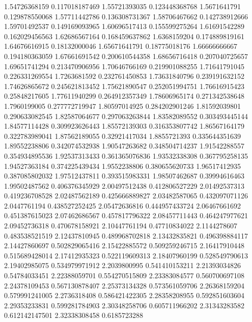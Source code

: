   1.54726368159   0.117018187469
  1.55721393035   0.123448368768
   1.5671641791   0.129878550068
  1.57711442786   0.136308731367
  1.58706467662   0.142738912666
  1.59701492537   0.149169093965
  1.60696517413   0.155599275264
  1.61691542289   0.162029456563
  1.62686567164   0.168459637862
   1.6368159204   0.174889819161
  1.64676616915    0.18132000046
  1.65671641791    0.18775018176
  1.66666666667   0.194180363059
  1.67661691542   0.200610544358
  1.68656716418   0.207040725657
  1.69651741294   0.213470906956
  1.70646766169   0.219901088255
  1.71641791045   0.226331269554
   1.7263681592   0.232761450853
  1.73631840796   0.239191632152
  1.74626865672   0.245621813452
  1.75621890547   0.252051994751
  1.76616915423    0.25848217605
  1.77611940299   0.264912357349
  1.78606965174   0.271342538648
   1.7960199005   0.277772719947
  1.80597014925   0.284202901246
  1.81592039801   0.290633082545
  1.82587064677   0.297063263844
  1.83582089552   0.303493445144
  1.84577114428   0.309923626443
  1.85572139303   0.316353807742
  1.86567164179   0.322783989041
  1.87562189055    0.32921417034
   1.8855721393   0.335644351639
  1.89552238806   0.342074532938
  1.90547263682   0.348504714237
  1.91542288557   0.354934895536
  1.92537313433   0.361365076836
  1.93532338308   0.367795258135
  1.94527363184   0.374225439434
   1.9552238806   0.380655620733
  1.96517412935   0.387085802032
  1.97512437811   0.393515983331
  1.98507462687    0.39994616463
  1.99502487562   0.406376345929
  2.00497512438   0.412806527229
  2.01492537313   0.419236708528
  2.02487562189   0.425666889827
  2.03482587065   0.432097071126
   2.0447761194   0.438527252425
  2.05472636816   0.444957433724
  2.06467661692   0.451387615023
  2.07462686567   0.457817796322
  2.08457711443   0.464247977621
  2.09452736318   0.470678158921
  2.10447761194    0.47710834022
   2.1144278607   0.483538521519
  2.12437810945   0.489968702818
  2.13432835821   0.496398884117
  2.14427860697   0.502829065416
  2.15422885572   0.509259246715
  2.16417910448   0.515689428014
  2.17412935323   0.522119609313
  2.18407960199   0.528549790613
  2.19402985075   0.534979971912
   2.2039800995   0.541410153211
  2.21393034826    0.54784033451
  2.22388059701   0.554270515809
  2.23383084577   0.560700697108
  2.24378109453   0.567130878407
  2.25373134328   0.573561059706
  2.26368159204   0.579991241005
   2.2736318408   0.586421422305
  2.28358208955   0.592851603604
  2.29353233831   0.599281784903
  2.30348258706   0.605711966202
  2.31343283582   0.612142147501
  2.32338308458     0.6185723288
